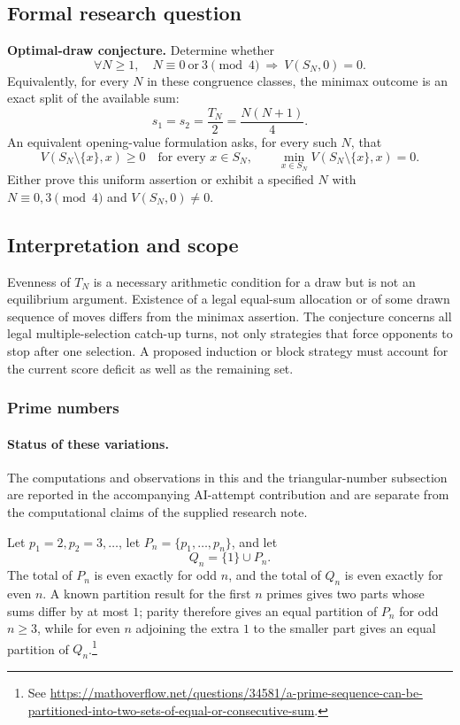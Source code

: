 \documentclass[11pt,a4paper]{article}
\begin{document}
\subsection*{Formal research question}

\textbf{Optimal-draw conjecture.} Determine whether
\[
\boxed{\quad \forall N\ge1,\quad
	N\equiv0\ \text{or}\ 3\pmod4
	\ \Longrightarrow\ V(S_N,0)=0.\quad}
\]
Equivalently, for every $N$ in these congruence classes, the minimax
outcome is an exact split of the available sum:
\[
s_1=s_2=\frac{T_N}{2}=\frac{N(N+1)}4.
\]
An equivalent opening-value formulation asks, for every such $N$, that
\[
V(S_N\setminus\{x\},x)\ge0\quad\text{for every }x\in S_N,
\qquad
\min_{x\in S_N}V(S_N\setminus\{x\},x)=0.
\]
Either prove this uniform assertion or exhibit a specified $N$ with
$N\equiv0,3\pmod4$ and $V(S_N,0)\ne0$.

\subsection*{Interpretation and scope}

Evenness of $T_N$ is a necessary arithmetic condition for a draw but is
not an equilibrium argument. Existence of a legal equal-sum allocation or
of some drawn sequence of moves differs from the minimax assertion.
The conjecture concerns all legal multiple-selection catch-up turns, not
only strategies that force opponents to stop after one selection. A
proposed induction or block strategy must account for the current score
deficit as well as the remaining set.

\subsubsection*{Prime numbers}
\paragraph{Status of these variations.}
The computations and observations in this and the triangular-number subsection are reported in the accompanying AI-attempt contribution and are separate from the computational claims of the supplied research note.

Let $p_1=2,p_2=3,\ldots$, let $P_n=\{p_1,\ldots,p_n\}$, and let
\[
Q_n=\{1\}\cup P_n.
\]
The total of $P_n$ is even exactly for odd $n$, and the total of $Q_n$ is even exactly for even $n$.  A known partition result for the first $n$ primes gives two parts whose sums differ by at most $1$; parity therefore gives an equal partition of $P_n$ for odd $n\ge3$, while for even $n$ adjoining the extra $1$ to the smaller part gives an equal partition of $Q_n$.\footnote{See \url{https://mathoverflow.net/questions/34581/a-prime-sequence-can-be-partitioned-into-two-sets-of-equal-or-consecutive-sum}.}
\end{document}
